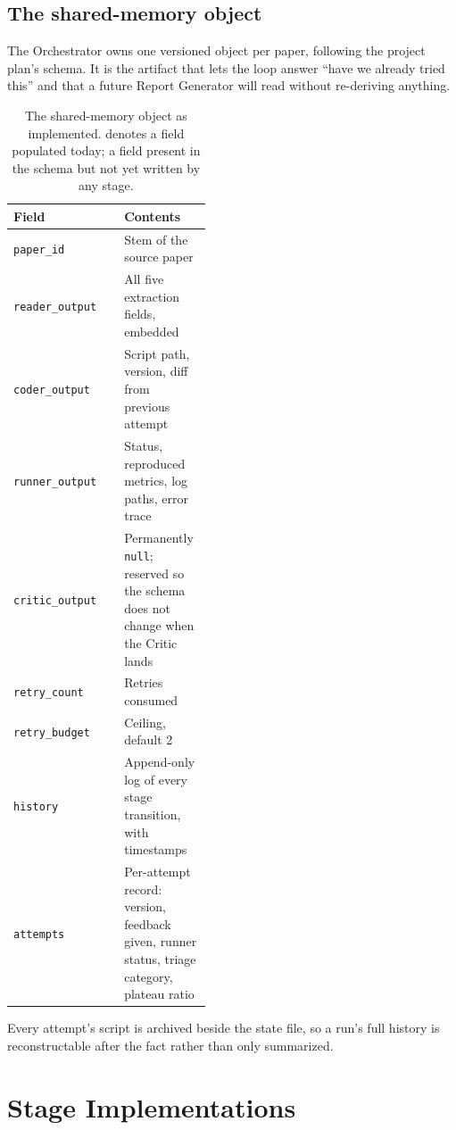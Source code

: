\documentclass[11pt]{article}
\newcommand{\built}{\textcolor{builtc}{\ding{51}}}
\newcommand{\absent}{\textcolor{missingc}{\ding{55}}}
\begin{document}
\subsection{The shared-memory object}

The Orchestrator owns one versioned object per paper, following the project plan's schema.
It is the artifact that lets the loop answer ``have we already tried this'' and that a
future Report Generator will read without re-deriving anything.

\begin{table}[htbp]
\centering
\small
\caption{The shared-memory object as implemented. \built{} denotes a field populated
today; \absent{} a field present in the schema but not yet written by any stage.}
\label{tab:state}
\begin{tabular}{llp{0.44\linewidth}}
\toprule
Field & & Contents \\
\midrule
\texttt{paper\_id}          & \built & Stem of the source paper \\
\texttt{reader\_output}     & \built & All five extraction fields, embedded \\
\texttt{coder\_output}      & \built & Script path, version, diff from previous attempt \\
\texttt{runner\_output}     & \built & Status, reproduced metrics, log paths, error trace \\
\texttt{critic\_output}     & \absent & Permanently \texttt{null}; reserved so the schema
                                        does not change when the Critic lands \\
\texttt{retry\_count}       & \built & Retries consumed \\
\texttt{retry\_budget}      & \built & Ceiling, default 2 \\
\texttt{history}            & \built & Append-only log of every stage transition, with
                                        timestamps \\
\texttt{attempts}           & \built & Per-attempt record: version, feedback given, runner
                                        status, triage category, plateau ratio \\
\bottomrule
\end{tabular}
\end{table}

Every attempt's script is archived beside the state file, so a run's full history is
reconstructable after the fact rather than only summarized.

\section{Stage Implementations}
\label{sec:stages}
\end{document}
